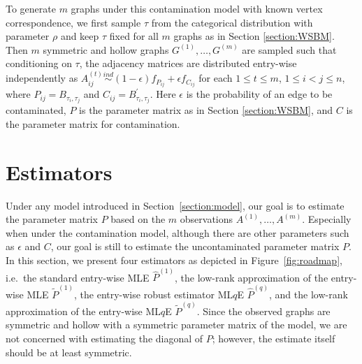 \documentclass[a4paper]{article}
\renewcommand{\hat}{\widehat}
\begin{document}
To generate $m$ graphs under this contamination model with known vertex correspondence, we first sample $\tau$ from the categorical distribution with parameter $\rho$ and keep $\tau$ fixed for all $m$ graphs as in Section \ref{section:WSBM}. Then $m$ symmetric and hollow graphs $G^{(1)}, \dotsc, G^{(m)}$ are sampled such that conditioning on $\tau$, the adjacency matrices are distributed entry-wise independently as $A^{(t)}_{ij} \stackrel{ind}{\sim} (1-\epsilon) f_{P_{ij}} + \epsilon f_{C_{ij}}$ for each $1 \le t \le m$, $1 \le i < j \le n$, where $P_{ij} = B_{\tau_i, \tau_j}$ and $C_{ij} = B^{\prime}_{\tau_i, \tau_j}$. Here $\epsilon$ is the probability of an edge to be contaminated, $P$ is the parameter matrix as in Section \ref{section:WSBM}, and $C$ is the parameter matrix for contamination.



\section{Estimators}
\label{section:estimators}
Under any model introduced in Section~\ref{section:model}, our goal is to estimate the parameter matrix $P$ based on the $m$ observations $A^{(1)}, \dotsc, A^{(m)}$. Especially when under the contamination model, although there are other parameters such as $\epsilon$ and $C$, our goal is still to estimate the uncontaminated parameter matrix $P$. In this section, we present four estimators as depicted in Figure~\ref{fig:roadmap}, i.e.\ the standard entry-wise MLE $\hat{P}^{(1)}$, the low-rank approximation of the entry-wise MLE $\widetilde{P}^{(1)}$, the entry-wise robust estimator ML$q$E $\hat{P}^{(q)}$, and the low-rank approximation of the entry-wise ML$q$E $\widetilde{P}^{(q)}$. Since the observed graphs are symmetric and hollow with a symmetric parameter matrix of the model, we are not concerned with estimating the diagonal of $P$; however, the estimate itself should be at least symmetric.
\end{document}
